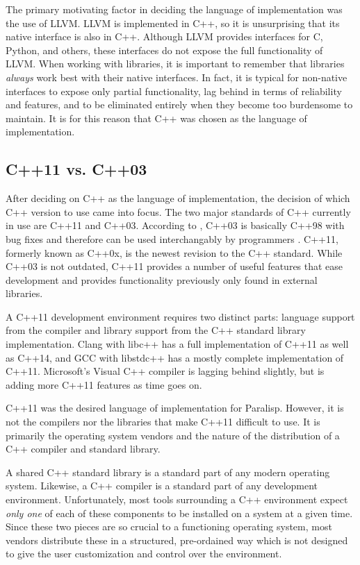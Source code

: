 \documentclass[
abstracton,
fontsize=12pt,
]{scrartcl}
\begin{document}
The primary motivating factor in deciding the language of implementation was the use of LLVM\@. LLVM is implemented in C++, so it is unsurprising that its native interface is also in C++. Although LLVM provides interfaces for C, Python, and others, these interfaces do not expose the full functionality of LLVM\@. When working with libraries, it is important to remember that libraries \emph{always} work best with their native interfaces. In fact, it is typical for non-native interfaces to expose only partial functionality, lag behind in terms of reliability and features, and to be eliminated entirely when they become too burdensome to maintain. It is for this reason that C++ was chosen as the language of implementation.

\subsection{C++11 vs. C++03}

After deciding on C++ as the language of implementation, the decision of which C++ version to use came into focus. The two major standards of C++ currently in use are C++11 and C++03. According to \citeauthor{bs-faq}, C++03 is basically C++98 with bug fixes and therefore can be used interchangably by programmers \autocite{bs-faq}. C++11, formerly known as C++0x, is the newest revision to the C++ standard. While C++03 is not outdated, C++11 provides a number of useful features that ease development and provides functionality previously only found in external libraries.

A C++11 development environment requires two distinct parts: language support from the compiler and library support from the C++ standard library implementation. Clang with libc++ has a full implementation of C++11 as well as C++14, and GCC with libstdc++ has a mostly complete implementation of C++11. Microsoft's Visual C++ compiler is lagging behind slightly, but is adding more C++11 features as time goes on.

C++11 was the desired language of implementation for Paralisp. However, it is not the compilers nor the libraries that make C++11 difficult to use. It is primarily the operating system vendors and the nature of the distribution of a C++ compiler and standard library.

A shared C++ standard library is a standard part of any modern operating system. Likewise, a C++ compiler is a standard part of any development environment. Unfortunately, most tools surrounding a C++ environment expect \emph{only one} of each of these components to be installed on a system at a given time. Since these two pieces are so crucial to a functioning operating system, most vendors distribute these in a structured, pre-ordained way which is not designed to give the user customization and control over the environment.
\end{document}
